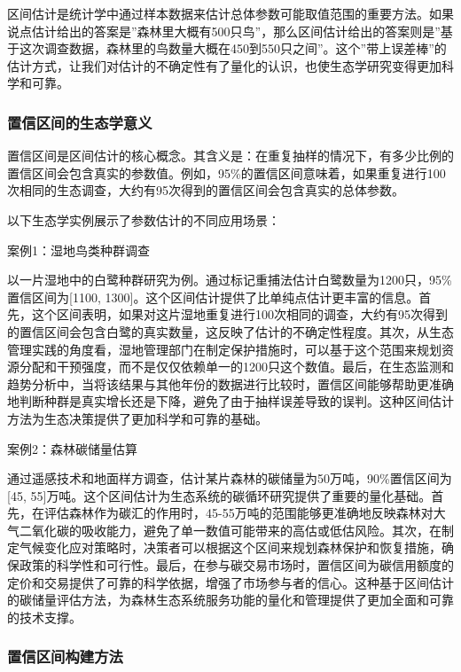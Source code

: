 \documentclass[
  twoside,12pt,fontset=none]{ctexbook}
\begin{document}
区间估计是统计学中通过样本数据来估计总体参数可能取值范围的重要方法。如果说点估计给出的答案是''森林里大概有500只鸟''，那么区间估计给出的答案则是''基于这次调查数据，森林里的鸟数量大概在450到550只之间''。这个''带上误差棒''的估计方式，让我们对估计的不确定性有了量化的认识，也使生态学研究变得更加科学和可靠。

\hypertarget{ux7f6eux4fe1ux533aux95f4ux7684ux751fux6001ux5b66ux610fux4e49}{%
\subsubsection{置信区间的生态学意义}\label{ux7f6eux4fe1ux533aux95f4ux7684ux751fux6001ux5b66ux610fux4e49}}

置信区间是区间估计的核心概念。其含义是：在重复抽样的情况下，有多少比例的置信区间会包含真实的参数值。例如，95\%的置信区间意味着，如果重复进行100次相同的生态调查，大约有95次得到的置信区间会包含真实的总体参数。

以下生态学实例展示了参数估计的不同应用场景：

案例1：湿地鸟类种群调查

以一片湿地中的白鹭种群研究为例。通过标记重捕法估计白鹭数量为1200只，95\%置信区间为{[}1100, 1300{]}。这个区间估计提供了比单纯点估计更丰富的信息。首先，这个区间表明，如果对这片湿地重复进行100次相同的调查，大约有95次得到的置信区间会包含白鹭的真实数量，这反映了估计的不确定性程度。其次，从生态管理实践的角度看，湿地管理部门在制定保护措施时，可以基于这个范围来规划资源分配和干预强度，而不是仅仅依赖单一的1200只这个数值。最后，在生态监测和趋势分析中，当将该结果与其他年份的数据进行比较时，置信区间能够帮助更准确地判断种群是真实增长还是下降，避免了由于抽样误差导致的误判。这种区间估计方法为生态决策提供了更加科学和可靠的基础。

案例2：森林碳储量估算

通过遥感技术和地面样方调查，估计某片森林的碳储量为50万吨，90\%置信区间为{[}45, 55{]}万吨。这个区间估计为生态系统的碳循环研究提供了重要的量化基础。首先，在评估森林作为碳汇的作用时，45-55万吨的范围能够更准确地反映森林对大气二氧化碳的吸收能力，避免了单一数值可能带来的高估或低估风险。其次，在制定气候变化应对策略时，决策者可以根据这个区间来规划森林保护和恢复措施，确保政策的科学性和可行性。最后，在参与碳交易市场时，置信区间为碳信用额度的定价和交易提供了可靠的科学依据，增强了市场参与者的信心。这种基于区间估计的碳储量评估方法，为森林生态系统服务功能的量化和管理提供了更加全面和可靠的技术支撑。

\hypertarget{ux7f6eux4fe1ux533aux95f4ux6784ux5efaux65b9ux6cd5}{%
\subsubsection{置信区间构建方法}\label{ux7f6eux4fe1ux533aux95f4ux6784ux5efaux65b9ux6cd5}}
\end{document}
